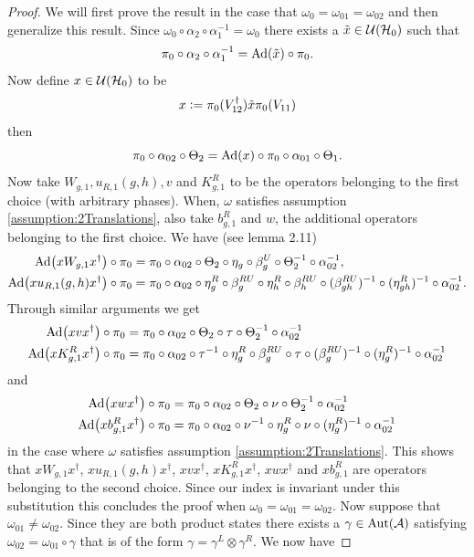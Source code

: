 \documentclass[11pt,a4paper,twoside]{article}
\numberwithin{equation}{section}
\begin{document}
	\begin{proof}
		We will first prove the result in the case that $\omega_0=\omega_{01}=\omega_{02}$ and then generalize this result. Since $\omega_0\circ\alpha_2\circ\alpha_1^{-1}=\omega_0$ there exists a $\tilde{x}\in\mathcal U(\mathcal H_0)$ such that
		\begin{equation}
			\pi_0\circ\alpha_2\circ\alpha_1^{-1}=\Ad{\tilde{x}}\circ\pi_0.
		\end{equation}
		Now define $x\in\mathcal U(\mathcal H_0)$ to be
		\begin{equation}
			x\vcentcolon= \pi_0(V_{12}^\dagger)\tilde{x} \pi_0(V_{11})
		\end{equation}
		then
		\begin{equation}
			\pi_0\circ\alpha_{02}\circ\Theta_2=\Ad{x}\circ\pi_0\circ\alpha_{01}\circ\Theta_1.
		\end{equation}
		Now take $W_{g,1},u_{R,1}(g,h), v$ and $K^R_{g,1}$ to be the operators belonging to the first choice (with arbitrary phases). When, $\omega$ satisfies assumption \ref{assumption:2Translations}, also take $b^R_{g,1}$ and $w$, the additional operators belonging to the first choice.
		We have (see \cite{ogata2021h3gmathbb} lemma 2.11)
		\begin{align}
			\Ad{xW_{g,1}x^\dagger}\circ\pi_0&=\pi_0\circ \alpha_{02}\circ\Theta_2\circ\eta_g\circ\beta_g^U\circ\Theta_2^{-1}\circ\alpha_{02}^{-1},\\
			\Ad{xu_{R,1}(g,h)x^\dagger}\circ\pi_0&=\pi_0\circ \alpha_{02}\circ\eta_g^R\circ\beta_g^{RU}\circ\eta_h^R\circ\beta_{h}^{RU}\circ(\beta_{gh}^{RU})^{-1}\circ(\eta_{gh}^R)^{-1}\circ\alpha_{02}^{-1}.
		\end{align}
		Through similar arguments we get
		\begin{align}
			\Ad{xvx^\dagger}\circ\pi_0&=\pi_0\circ\alpha_{02}\circ\Theta_2\circ\tau\circ\Theta_2^{-1}\circ\alpha_{02}^{-1}\\
			\Ad{xK^R_{g,1}x^\dagger}\circ\pi_0&=\pi_0\circ \alpha_{02}\circ\tau^{-1}\circ\eta_g^R\circ\beta_g^{RU}\circ\tau\circ(\beta_g^{RU})^{-1}\circ(\eta^R_g)^{-1}\circ\alpha_{02}^{-1}
		\end{align}
		and
		\begin{align}
			\Ad{xwx^\dagger}\circ\pi_0&=\pi_0\circ\alpha_{02}\circ\Theta_2\circ\nu\circ\Theta_2^{-1}\circ\alpha_{02}^{-1}\\
			\Ad{xb^R_{g,1}x^\dagger}\circ\pi_0&=\pi_0\circ \alpha_{02}\circ\nu^{-1}\circ\eta_g^R\circ\nu\circ(\eta_g^R)^{-1}\circ\alpha_{02}^{-1}
		\end{align}
		in the case where $\omega$ satisfies assumption \ref{assumption:2Translations}. This shows that $xW_{g,1}x^\dagger$, $xu_{R,1}(g,h)x^\dagger$, $xvx^\dagger$, $xK^R_{g,1}x^\dagger$, $xwx^\dagger$ and $x b^R_{g,1}$ are operators belonging to the second choice. Since our index is invariant under this substitution this concludes the proof when $\omega_0=\omega_{01}=\omega_{02}$. Now suppose that $\omega_{01}\neq\omega_{02}$. Since they are both product states there exists a $\gamma\in\Aut{\AA}$ satisfying $\omega_{02}=\omega_{01}\circ\gamma$ that is of the form $\gamma=\gamma^L\otimes\gamma^R$. We now have

\end{proof}
\end{document}
